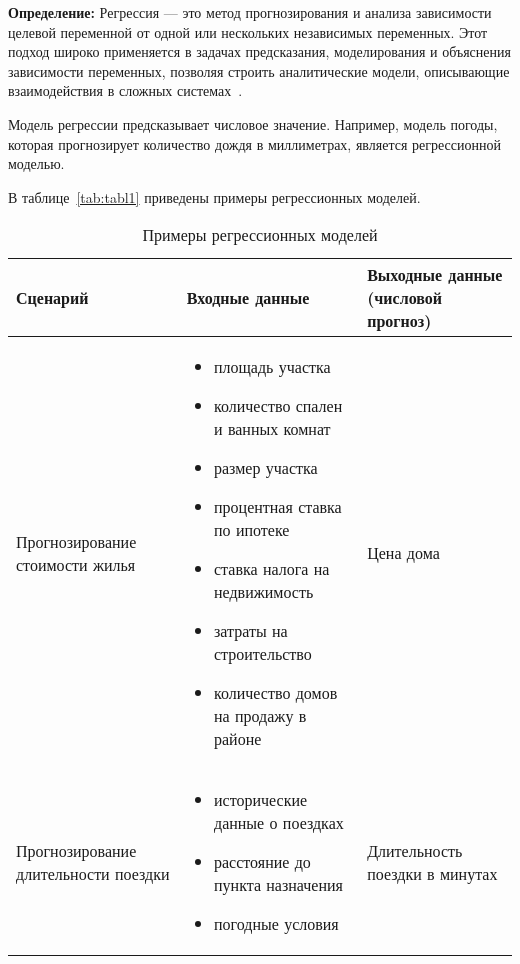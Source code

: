 \textbf{Определение:} Регрессия — это метод прогнозирования и анализа зависимости целевой переменной от одной или нескольких независимых переменных.
Этот подход широко применяется в задачах предсказания, моделирования и объяснения зависимости переменных, позволяя строить аналитические модели, описывающие взаимодействия в сложных системах~\cite{seber, montgomery}.

Модель регрессии предсказывает числовое значение.
Например, модель погоды, которая прогнозирует количество дождя в миллиметрах, является регрессионной моделью.

В таблице~\ref{tab:tabl1} приведены примеры регрессионных моделей.

\begin{table}[H]
    \centering
    \small
    \caption{Примеры регрессионных моделей}
    \begin{tabularx}{\textwidth}{|>{\centering\arraybackslash}X|>{\centering\arraybackslash}X|>{\centering\arraybackslash}X|}
        \hline
        Сценарий & Входные данные & Выходные данные \newline(числовой прогноз) \\
        \hline
        Прогнозирование стоимости жилья &
        \begin{itemize}[label=---,leftmargin=*,nosep]
            \item площадь участка
            \item количество спален и ванных комнат
            \item размер участка
            \item процентная ставка по ипотеке
            \item ставка налога на недвижимость
            \item затраты на строительство
            \item количество домов на продажу в районе
        \end{itemize} &
        Цена дома \\
        \hline
        Прогнозирование длительности поездки &
        \begin{itemize}[label=---,leftmargin=*,nosep]
            \item исторические данные о поездках
            \item расстояние до пункта назначения
            \item погодные условия
        \end{itemize} &
        Длительность поездки в минутах \\

\end{tabularx}
\end{table}
